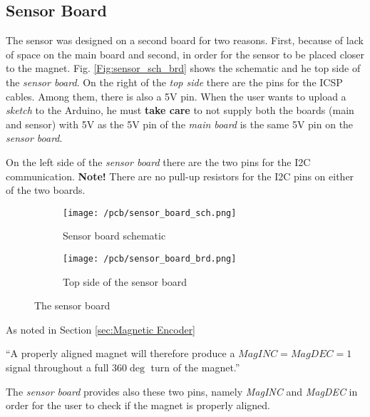 \subsection{Sensor Board}

The sensor was designed on a second board for two reasons. First, because of lack of space on the main board and second, in order for the sensor to be placed closer to the magnet. Fig. \ref{Fig:sensor_sch_brd} shows the schematic and he top side of the \textit{sensor board}. On the right of the \textit{top side} there are the pins for the ICSP cables. Among them, there is also a 5V pin. When the user wants to upload a \textit{sketch} to the Arduino, he must \textbf{take care} to not supply both the boards (main and sensor) with 5V as the 5V pin of the \textit{main board} is the same 5V pin on the \textit{sensor board}.

On the left side of the \textit{sensor board} there are the two pins for the I2C communication. \textbf{Note!} There are no pull-up resistors for the I2C pins on either of the two boards.



\begin{figure}[H]
    
    \begin{subfigure}[t]{\textwidth}
    \centering
        \texttt{[image: /pcb/sensor\_board\_sch.png]}
        \caption{Sensor board schematic}
        \label{Fig:sensor_sch}
    \end{subfigure}
    
    \begin{subfigure}[h]{\textwidth}
    	\centering
        \texttt{[image: /pcb/sensor\_board\_brd.png]}
        \caption{Top side of the sensor board}
        \label{Fig:sensor_brd}
    \end{subfigure}
        
    \caption{The sensor board}
    \label{Fig:sensor board}
\end{figure}

\newpage


As noted in Section \ref{sec:Magnetic Encoder} 

``A properly aligned magnet will therefore produce a $MagINC=MagDEC=1$ signal throughout a full $360\deg$ turn of the magnet.''

The \textit{sensor board} provides also these two pins, namely \textit{MagINC} and \textit{MagDEC} in order for the user to check if the magnet is properly aligned.






